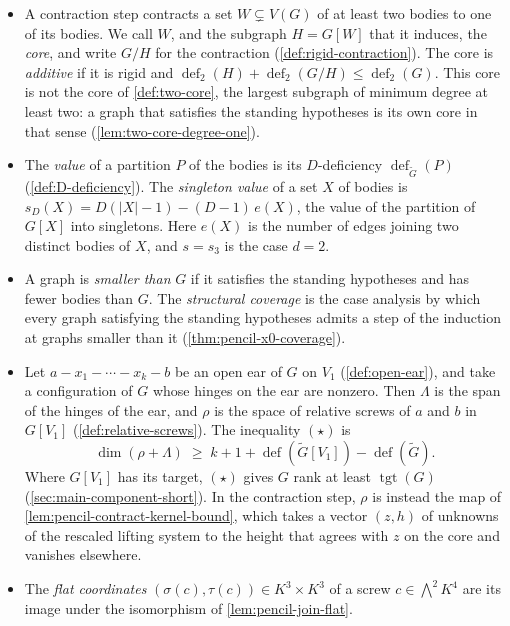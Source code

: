 \begin{itemize}
  \item A contraction step contracts a set $W \subsetneq V(G)$ of at least
    two bodies to one of its bodies. We call $W$, and the subgraph
    $H = G[W]$ that it induces, the \emph{core}, and write $G/H$ for the
    contraction (\cref{def:rigid-contraction}). The core is
    \emph{additive} if it is rigid and
    $\operatorname{def}_2(H) + \operatorname{def}_2(G/H) \le
    \operatorname{def}_2(G)$. This core is not the core of
    \cref{def:two-core}, the largest subgraph of minimum degree at least
    two: a graph that satisfies the standing hypotheses is its own core in
    that sense (\cref{lem:two-core-degree-one}).
  \item The \emph{value} of a partition $P$ of the bodies is its
    $D$-deficiency $\operatorname{def}_{\tilde G}(P)$
    (\cref{def:D-deficiency}). The \emph{singleton value} of a set $X$ of
    bodies is $s_D(X) = D(|X| - 1) - (D - 1)\, e(X)$, the value of the
    partition of $G[X]$ into singletons. Here $e(X)$ is the number of edges
    joining two distinct bodies of $X$, and $s = s_3$ is the case $d = 2$.
  \item A graph is \emph{smaller than} $G$ if it satisfies the standing
    hypotheses and has fewer bodies than $G$. The \emph{structural
    coverage} is the case analysis by which every graph satisfying the
    standing hypotheses admits a step of the induction at graphs smaller
    than it (\cref{thm:pencil-x0-coverage}).
  \item Let $a - x_1 - \cdots - x_k - b$ be an open ear of $G$ on $V_1$
    (\cref{def:open-ear}), and take a configuration of $G$
    whose hinges on the ear are nonzero. Then $\Lambda$ is the span of the
    hinges of the ear, and $\rho$ is the space of relative screws of $a$
    and $b$ in $G[V_1]$ (\cref{def:relative-screws}). The inequality
    $(\star)$ is
    \[
      \dim(\rho + \Lambda) \;\ge\; k + 1 + \operatorname{def}(\tilde
      G[V_1]) - \operatorname{def}(\tilde G).
    \]
    Where $G[V_1]$ has its target, $(\star)$ gives $G$ rank at least
    $\operatorname{tgt}(G)$ (\cref{sec:main-component-short}). In the
    contraction step, $\rho$ is instead the map of
    \cref{lem:pencil-contract-kernel-bound}, which takes a vector $(z, h)$
    of unknowns of the rescaled lifting system to the height that agrees
    with $z$ on the core and vanishes elsewhere.
  \item The \emph{flat coordinates} $(\sigma(c), \tau(c)) \in K^3 \times
    K^3$ of a screw $c \in \bigwedge^2 K^4$ are its image under the
    isomorphism of \cref{lem:pencil-join-flat}.
\end{itemize}

